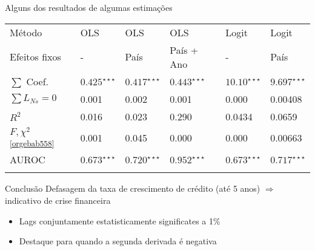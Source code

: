 \documentclass[presentation]{beamer}
\begin{document}
\begin{frame}[label={sec:org25f2f8e}]{Alguns dos resultados de algumas estimações}
\begin{center}
\begin{center}
\begin{tabular}{llllll}
\hline
Método & OLS & OLS & OLS & Logit & Logit\\
Efeitos fixos & - & País & País + Ano & - & País\\
\hline
\(\sum\) Coef. & \(0.425^{\star\star\star}\) & \(0.417^{\star\star\star}\) & \(0.443^{\star\star\star}\) & \(10.10^{\star\star\star}\) & \(9.697^{\star\star\star}\)\\
\(\sum L_{Ns} = 0\)\footnotemark & 0.001 & 0.002 & 0.001 & 0.000 & 0.00408\\
\(R^2\) & 0.016 & 0.023 & 0.290 & 0.0434 & 0.0659\\
\(F, \chi^{2}\)\textsuperscript{\ref{orgebab558}} & 0.001 & 0.045 & 0.000 & 0.000 & 0.00663\\
AUROC & \(0.673^{\star\star\star}\) & \(0.720^{\star\star\star}\) & \(0.952^{\star\star\star}\) & \(0.673^{\star\star\star}\) & \(0.717^{\star\star\star}\)\\
\hline
 &  &  &  &  & \\
\end{tabular}
\end{center}
\end{center}


\begin{block}{Conclusão}
Defasagem da taxa de crescimento de crédito (até 5 anos) \(\Rightarrow\) indicativo de crise financeira
\begin{itemize}
\item Lags conjuntamente estatisticamente significates a 1\%
\item Destaque para quando a segunda derivada é negativa
\end{itemize}
\end{block}
\end{frame}
\end{document}

